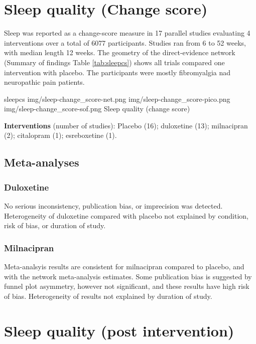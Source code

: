 \documentclass{report}\usepackage[]{graphicx}\usepackage[]{color}
\begin{document}
\section{Sleep quality (Change score)}


Sleep was reported as a change-score measure in 17 parallel studies evaluating 4 interventions over a total of 6077 participants. Studies ran from 6 to 52 weeks, with median length 12 weeks. The geometry of the direct-evidence network (Summary of findings Table \ref{tab:sleepcs}) shows all trials compared one intervention with placebo. The participants were mostly fibromyalgia nad neuropathic pain patients.

\soffignew
{sleepcs}
{img/sleep-change_score-net.png}
{img/sleep-change_score-pico.png}
{img/sleep-change_score-sof.png}
{Sleep quality (change score)}

\textbf{Interventions} (number of studies): Placebo (16); duloxetine (13); milnacipran (2); citalopram (1); esreboxetine (1).


\subsection{Meta-analyses}

\subsubsection{Duloxetine}

No serious inconsistency, publication bias, or imprecision was detected. Heterogeneity of duloxetine compared with placebo not explained by condition, risk of bias, or duration of study.

\subsubsection{Milnacipran}

Meta-analsyis results are consistent for milnacipran compared to placebo, and with the network meta-analysis estimates. Some publication bias is suggested by funnel plot asymmetry, however not significant, and these results have high risk of bias. Heterogeneity of results not explained by duration of study.

\section{Sleep quality (post intervention)}

\end{document}

